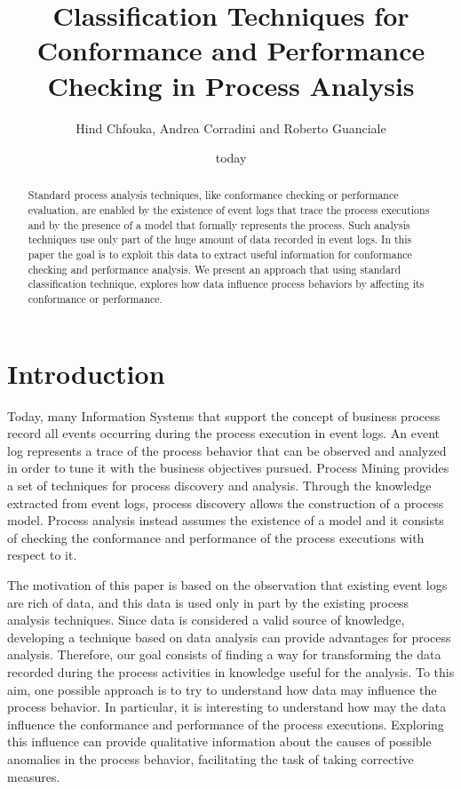 \documentclass{llncs}
\title{Classification Techniques for Conformance and Performance Checking in Process Analysis}
\author{Hind Chfouka\inst{1}, Andrea Corradini\inst{1} and Roberto Guanciale\inst{2}}
\institute{Department of Computer Science, University of Pisa, Italy\and School of Computer Science and Communication,
KTH Royal Institute of Technology, Stockholm, Sweden}
\date{today}
\begin{document}
\maketitle
\begin{abstract}
Standard process analysis techniques, like conformance checking or performance evaluation, are enabled by the existence of event logs that trace the process executions and by the presence of a model that formally represents the process. Such analysis techniques use only part of the huge amount of data recorded in event logs. In this paper the goal is to exploit this data to extract useful information for  conformance checking and  performance analysis. We present an approach that using standard classification technique, explores how data influence process behaviors by affecting its conformance or performance.
\end{abstract}

\section{Introduction}
Today, many Information Systems that support  the concept of business process record all events occurring during the process execution in  event logs. An event log represents a trace of the process behavior that can be observed and analyzed in order to tune it with the business objectives pursued. Process Mining provides a set of techniques for process discovery and analysis. Through the knowledge extracted from event logs, process discovery allows the construction of a process model. Process analysis instead assumes the existence of a model and it consists of checking the conformance and performance of the process executions with respect to it.

The motivation of this paper is based on the observation that existing event logs are rich of data, and this data is used only in part by the existing process analysis techniques. Since data is considered a valid source of knowledge, developing a technique based on data analysis can provide advantages for  process analysis.
Therefore, our goal consists of finding a way for transforming the data recorded during the process activities in knowledge useful for the analysis. To this aim, one possible approach is to try to understand how data may influence the process behavior. In particular, it is interesting to understand how may the data influence the conformance and performance of the process executions. Exploring this influence can provide qualitative information about the causes of possible anomalies in the process behavior, facilitating the task of taking corrective measures.
\end{document}
